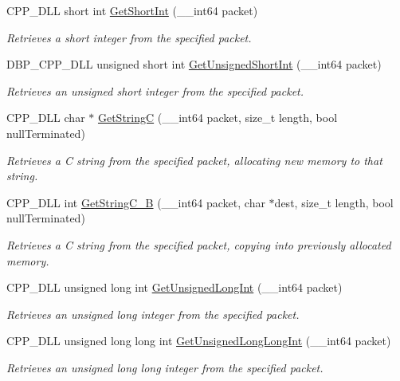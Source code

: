 \begin{DoxyCompactItemize}
CPP\_\-DLL short int \hyperlink{namespacemn_a39671a53d16a304d993465efd819a57d}{GetShortInt} (\_\-\_\-int64 packet)
\begin{DoxyCompactList}\small\item\em Retrieves a short integer from the specified packet. \item\end{DoxyCompactList}\item 
DBP\_\-CPP\_\-DLL unsigned short int \hyperlink{namespacemn_a3d09a445de8ecd6241d758b218426cd5}{GetUnsignedShortInt} (\_\-\_\-int64 packet)
\begin{DoxyCompactList}\small\item\em Retrieves an unsigned short integer from the specified packet. \item\end{DoxyCompactList}\item 
CPP\_\-DLL char $\ast$ \hyperlink{namespacemn_a68b28730fe0c294b9c9e7594617b5c7b}{GetStringC} (\_\-\_\-int64 packet, size\_\-t length, bool nullTerminated)
\begin{DoxyCompactList}\small\item\em Retrieves a C string from the specified packet, allocating new memory to that string. \item\end{DoxyCompactList}\item 
CPP\_\-DLL int \hyperlink{namespacemn_a49b801f3e32ae023a557d277e76812d2}{GetStringC\_\-B} (\_\-\_\-int64 packet, char $\ast$dest, size\_\-t length, bool nullTerminated)
\begin{DoxyCompactList}\small\item\em Retrieves a C string from the specified packet, copying into previously allocated memory. \item\end{DoxyCompactList}\item 
CPP\_\-DLL unsigned long int \hyperlink{namespacemn_a46d1c79f605b4dcb321d1618415b065a}{GetUnsignedLongInt} (\_\-\_\-int64 packet)
\begin{DoxyCompactList}\small\item\em Retrieves an unsigned long integer from the specified packet. \item\end{DoxyCompactList}\item 
CPP\_\-DLL unsigned long long int \hyperlink{namespacemn_aa24b3cfab35ce088892686c676fd4463}{GetUnsignedLongLongInt} (\_\-\_\-int64 packet)
\begin{DoxyCompactList}\small\item\em Retrieves an unsigned long long integer from the specified packet. \item\end{DoxyCompactList}\item 

\end{DoxyCompactItemize}
